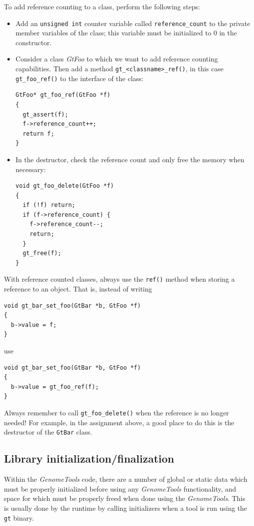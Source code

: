 \documentclass[11pt,final]{article}
\newcommand{\keyword}[1]{\lstinline{#1}}
\newcommand{\Gt}[0]{\emph{GenomeTools}\xspace}
\begin{document}
To add reference counting to a class, perform the following steps:
\begin{itemize}
\item Add an \keyword{unsigned int} counter variable called
\keyword{reference_count} to the private member variables of the class; this
variable must be initialized to 0 in the constructor.
\item Consider a class \emph{GtFoo} to which we want to add reference counting
capabilities. Then add a method \keyword{gt_<classname>_ref()}, in this case
\keyword{gt_foo_ref()} to the interface of the class:

\begin{lstlisting}
GtFoo* gt_foo_ref(GtFoo *f)
{
  gt_assert(f);
  f->reference_count++;
  return f;
}
\end{lstlisting}

\item
In the destructor, check the reference count and only free the memory when
necessary:

\begin{lstlisting}
void gt_foo_delete(GtFoo *f)
{
  if (!f) return;
  if (f->reference_count) {
    f->reference_count--;
    return;
  }
  gt_free(f);
}
\end{lstlisting}

\end{itemize}

With reference counted classes, always use the \keyword{ref()} method when
storing a reference to an object. That is, instead of writing

\begin{lstlisting}
void gt_bar_set_foo(GtBar *b, GtFoo *f)
{
  b->value = f;
}
\end{lstlisting}

use

\begin{lstlisting}
void gt_bar_set_foo(GtBar *b, GtFoo *f)
{
  b->value = gt_foo_ref(f);
}
\end{lstlisting}

Always remember to call \keyword{gt_foo_delete()} when the reference is
no longer needed! For example, in the assignment above, a good place to do this
is the destructor of the \keyword{GtBar} class.

\subsection{Library initialization/finalization}
Within the \Gt code, there are a number of global or static data which must be
properly initialized before using any \Gt functionality, and space for which
must be properly freed when done using the \Gt . This is usually done by the
runtime by calling initializers when a tool is run using the \keyword{gt}
binary.
\end{document}
